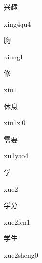 \begin{verbete}[xing4qu4]{兴趣}
\begin{pronuncia}{xing4qu4}
\end{pronuncia}
\end{verbete}

\begin{verbete}[xiong1]{胸}
\begin{pronuncia}{xiong1}
\end{pronuncia}
\end{verbete}

\begin{verbete}[xiu1]{修}
\begin{pronuncia}{xiu1}
\end{pronuncia}
\end{verbete}

\begin{verbete}[xiu1xi0]{休息}
\begin{pronuncia}{xiu1xi0}
\end{pronuncia}
\end{verbete}

\begin{verbete}[xu1yao4]{需要}
\begin{pronuncia}{xu1yao4}
\end{pronuncia}
\end{verbete}

\begin{verbete}[xue2]{学}
\begin{pronuncia}{xue2}
\end{pronuncia}
\end{verbete}

\begin{verbete}{学分}
\begin{pronuncia}{xue2fen1}
\end{pronuncia}
\end{verbete}

\begin{verbete}{学生}
\begin{pronuncia}{xue2sheng0}
\end{pronuncia}
\end{verbete}

